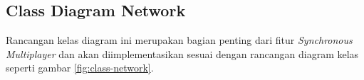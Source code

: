     




\subsection{Class Diagram Network}
Rancangan kelas diagram ini merupakan bagian penting dari fitur \textit{Synchronous Multiplayer} dan akan diimplementasikan sesuai dengan rancangan diagram kelas seperti gambar \ref{fig:class-network}.

